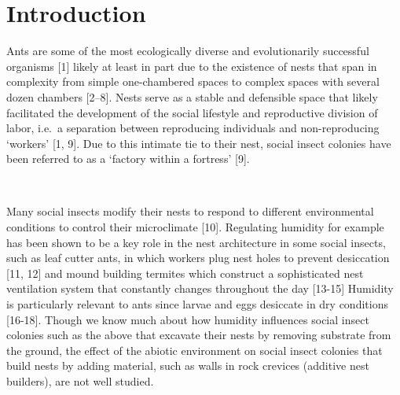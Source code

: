 \documentclass[3p]{elsarticle} %
\begin{document}
\newpage

\hypertarget{introduction}{%
\section{Introduction}\label{introduction}}

Ants are some of the most ecologically diverse and evolutionarily
successful organisms {[}1{]} likely at least in part due to the
existence of nests that span in complexity from simple one-chambered
spaces to complex spaces with several dozen chambers {[}2--8{]}. Nests
serve as a stable and defensible space that likely facilitated the
development of the social lifestyle and reproductive division of labor,
i.e.~a separation between reproducing individuals and non-reproducing
`workers' {[}1, 9{]}. Due to this intimate tie to their nest, social
insect colonies have been referred to as a `factory within a fortress'
{[}9{]}.

~

Many social insects modify their nests to respond to different
environmental conditions to control their microclimate {[}10{]}.
Regulating humidity for example has been shown to be a key role in the
nest architecture in some social insects, such as leaf cutter ants, in
which workers plug nest holes to prevent desiccation {[}11, 12{]} and
mound building termites which construct a sophisticated nest ventilation
system that constantly changes throughout the day {[}13-15{]} Humidity
is particularly relevant to ants since larvae and eggs desiccate in dry
conditions {[}16-18{]}. Though we know much about how humidity
influences social insect colonies such as the above that excavate their
nests by removing substrate from the ground, the effect of the abiotic
environment on social insect colonies that build nests by adding
material, such as walls in rock crevices (additive nest builders), are
not well studied.

~
\end{document}
